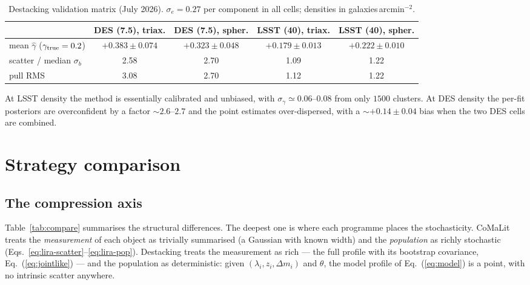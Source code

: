 \documentclass[11pt,a4paper]{article}
\begin{document}
\begin{table}
\centering
\caption{Destacking validation matrix (July 2026). $\sigma_e = 0.27$
per component in all cells; densities in galaxies\,arcmin$^{-2}$.}
\label{tab:matrix}
\begin{tabular}{lcccc}
\toprule
 & DES (7.5), triax. & DES (7.5), spher. & LSST (40), triax. & LSST (40), spher.\\
\midrule
mean $\hat\gamma$ ($\gamma_{\rm true}=0.2$) & $+0.383\pm0.074$ & $+0.323\pm0.048$ & $+0.179\pm0.013$ & $+0.222\pm0.010$\\
scatter / median $\sigma_b$ & 2.58 & 2.70 & 1.09 & 1.22\\
pull RMS & 3.08 & 2.70 & 1.12 & 1.22\\
\bottomrule
\end{tabular}
\end{table}

At LSST density the method is essentially calibrated and unbiased, with
$\sigma_\gamma \simeq 0.06$--$0.08$ from only $1500$ clusters. At DES
density the per-fit posteriors are overconfident by a factor
${\sim}2.6$--$2.7$ and the point estimates over-dispersed, with a
${\sim}+0.14\pm0.04$ bias when the two DES cells are combined.

\section{Strategy comparison}
\label{sec:comparison}

\subsection{The compression axis}

Table~\ref{tab:compare} summarises the structural differences. The deepest
one is where each programme places the stochasticity. CoMaLit treats the
\emph{measurement} of each object as trivially summarised (a Gaussian with
known width) and the \emph{population} as richly stochastic
(Eqs.~\ref{eq:lira-scatter}--\ref{eq:lira-pop}). Destacking treats the
measurement as rich --- the full profile with its bootstrap covariance,
Eq.~(\ref{eq:jointlike}) --- and the population as deterministic: given
$(\lambda_i, z_i, \Delta m_i)$ and $\theta$, the model profile of
Eq.~(\ref{eq:model}) is a point, with no intrinsic scatter anywhere.
\end{document}
